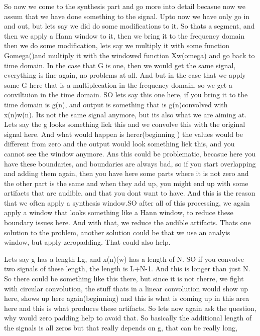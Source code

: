 So now we come to the synthesis part and go more into detail becasue now we assum that we have done something to the signal.  Upto now we have only go in and out, but lets say we did do some modifications to it. So thats a segment, and then we apply a Hann window to it, then we bring it to the frequency domain then we do some modification, lets say we multiply it with some function Gomega()and multiply it with the windowed function Xw(omega) and go back to time domain. In the case that G is one, then we would get the same signal, everything is fine again, no problems at all.  And but in the case that we apply some G here that is a multiplecation in the frequency domain, so we get a conviltuion in the time domain. SO lets say this one here, if you bring it to the time domain is g(n), and output is something that is g(n)convolved with x(n)w(n).  Its not the same signal anymore, but its also what we are aiming at. Lets say the g looks something liek this and we convolve this with the original signal here. And what would happen is herer(beginning ) the values would be different from zero and the output would look something liek this, and you cannot see the window anymore. Ans this could be problematic, becasue here you have these boundaries, and boundaries are always bad, so if you start overlapping and adding them again, then you have here some parts where it is not zero and the other part is the same and when they add up, you might end up with some artifacts that are audible. and that you dont want to have.  And this is the reason that we often apply a synthesis window.SO after all of this processing, we again apply a window that looks something like a Hann window, to reduce these boundary issues here. And with that, we reduce the audible artifacts.  Thats one solution to the problem, another solution could be that we use an analyis window, but apply zeropadding.  That could also help. 

Lets say g has a length Lg, and x(n)(w) has a length of N.  SO if you convolve two signals of these length, the length is L+N-1. And this is longer than just N. So there could be something like this there, but since it is not therre, we fight with circular convolution, the stuff thats in a linear convolution would show up here, shows up here again(beginning) and this is what is coming up in this area here and  this is what produces these artifacts. So lets now again ask the question, why would zero padding help to avoid that. So basically the additional length of the signals is all zeros but that really depends on g, that can be really long, 

